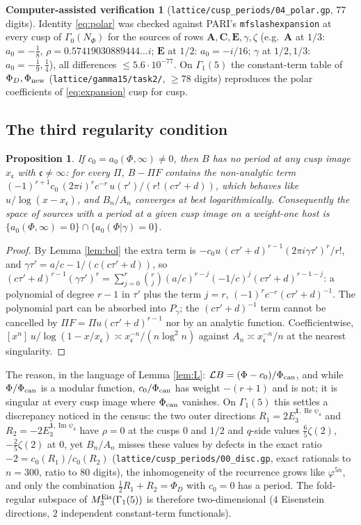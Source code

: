 \documentclass[11pt]{amsart}
\newtheorem{proposition}[theorem]{Proposition}
\theoremstyle{definition}
\newtheorem{verification}[theorem]{Computer-assisted verification}
\theoremstyle{remark}
\newcommand{\ct}{a_0}\renewcommand{\Re}{\operatorname{Re}}\renewcommand{\Im}{\operatorname{Im}}
\newcommand{\cc}{\mathfrak c}\newcommand{\Pc}{\Pi_{\cc}}\newcommand{\Pq}{\Pi^{q}}
\newcommand{\Phinew}{\Phi_{\rm new}}\newcommand{\Phican}{\Phi_{\rm can}}
\begin{document}
\begin{verification}[\texttt{lattice/cusp\_periods/04\_polar.gp}, $77$ digits]
Identity \eqref{eq:polar} was checked against PARI's \texttt{mfslashexpansion} at every cusp of $\Gamma_0(N_\Phi)$ for the sources of rows $\mathbf A,\mathbf C,\mathbf E,\gamma,\zeta$ (e.g.\ $\mathbf A$ at $1/3$: $\ct=-\tfrac18$, $\rho=0.57419030889444\ldots i$; $\mathbf E$ at $1/2$: $\ct=-i/16$; $\gamma$ at $1/2,1/3$: $\ct=-\tfrac19,\tfrac14$), all differences $\le5.6\cdot10^{-77}$. On $\Gamma_1(5)$ the constant-term table of $\Phi_D,\Phinew$ (\texttt{lattice/gamma15/task2/}, $\ge78$ digits) reproduces the polar coefficients of \eqref{eq:expansion} cusp for cusp.
\end{verification}

\subsection{The third regularity condition}
\begin{proposition}\label{prop:third}
If $c_0=\ct(\Phi,\infty)\ne0$, then $B$ has no period at any cusp image $x_{\cc}$ with $\cc\ne\infty$: for every $\Pi$, $B-\Pi F$ contains the non-analytic term $(-1)^{r+1}c_0\,(2\pi i)^rc^{-r}\,u(\tau')/(r!\,(c\tau'+d))$, which behaves like $u/\log(x-x_{\cc})$, and $B_n/A_n$ converges at best logarithmically. Consequently the space of sources with a period at a given cusp image on a weight-one host is $\{\ct(\Phi,\infty)=0\}\cap\{\ct(\Phi|\gamma)=0\}$.
\end{proposition}
\begin{proof}
By Lemma \ref{lem:bol} the extra term is $-c_0u\,(c\tau'+d)^{r-1}(2\pi i\gamma\tau')^r/r!$, and $\gamma\tau'=a/c-1/(c(c\tau'+d))$, so $(c\tau'+d)^{r-1}(\gamma\tau')^r=\sum_{j=0}^r\binom rj(a/c)^{r-j}(-1/c)^j(c\tau'+d)^{r-1-j}$: a polynomial of degree $r-1$ in $\tau'$ plus the term $j=r$, $(-1)^rc^{-r}(c\tau'+d)^{-1}$. The polynomial part can be absorbed into $P_\gamma$; the $(c\tau'+d)^{-1}$ term cannot be cancelled by $\Pi F=\Pi u(c\tau'+d)^{r-1}$ nor by an analytic function. Coefficientwise, $[x^n]\,u/\log(1-x/x_{\cc})\asymp x_{\cc}^{-n}/(n\log^2n)$ against $A_n\asymp x_{\cc}^{-n}/n$ at the nearest singularity.
\end{proof}

The reason, in the language of Lemma \ref{lem:L}: $\mathcal LB=(\Phi-c_0)/\Phican$, and while $\Phi/\Phican$ is a modular function, $c_0/\Phican$ has weight $-(r+1)$ and is not; it is singular at every cusp image where $\Phican$ vanishes. On $\Gamma_1(5)$ this settles a discrepancy noticed in the census: the two outer directions $R_1=2E_3^{\mathbf 1,\Re\psi_4}$ and $R_2=-2E_3^{\mathbf 1,\Im\psi_4}$ have $\rho=0$ at the cusps $0$ and $1/2$ and $q$-side values $\tfrac65\zeta(2)$, $-\tfrac25\zeta(2)$ at $0$, yet $B_n/A_n$ misses these values by defects in the exact ratio $-2=c_0(R_1)/c_0(R_2)$ (\texttt{lattice/cusp\_periods/00\_disc.gp}, exact rationals to $n=300$, ratio to $80$ digits), the inhomogeneity of the recurrence grows like $\varphi^{5n}$, and only the combination $\tfrac12R_1+R_2=\Phi_D$ with $c_0=0$ has a period. The fold-regular subspace of $M_3^{\rm Eis}(\Gamma_1(5))$ is therefore two-dimensional ($4$ Eisenstein directions, $2$ independent constant-term functionals).
\end{document}
